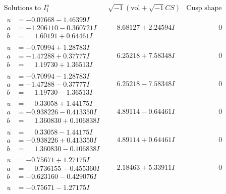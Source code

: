 \documentclass[1p]{elsarticle_modified}
\theoremstyle{definition}
\newcommand{\I}{\sqrt{-1}}
\begin{document}
$$\begin{array}{c|c|c}
\text{Solutions to }I^u_{1}& \I (\text{vol} + \sqrt{-1}CS) & \text{Cusp shape}\\
 \hline 
\begin{aligned}
u &= -0.07668 - 1.46399 I \\
a &= -1.206110 - 0.360721 I \\
b &= \phantom{-}1.60191 + 0.64461 I\end{aligned}
 & \phantom{-}8.68127 + 2.24594 I & \phantom{-0.000000 } 0 \\ \hline\begin{aligned}
u &= -0.70994 + 1.28783 I \\
a &= -1.47288 + 0.37777 I \\
b &= \phantom{-}1.19730 + 1.36513 I\end{aligned}
 & \phantom{-}6.25218 + 7.58348 I & \phantom{-0.000000 } 0 \\ \hline\begin{aligned}
u &= -0.70994 - 1.28783 I \\
a &= -1.47288 - 0.37777 I \\
b &= \phantom{-}1.19730 - 1.36513 I\end{aligned}
 & \phantom{-}6.25218 - 7.58348 I & \phantom{-0.000000 } 0 \\ \hline\begin{aligned}
u &= \phantom{-}0.33058 + 1.44175 I \\
a &= -0.938226 - 0.413350 I \\
b &= \phantom{-}1.360830 + 0.106838 I\end{aligned}
 & \phantom{-}4.89114 - 0.64461 I & \phantom{-0.000000 } 0 \\ \hline\begin{aligned}
u &= \phantom{-}0.33058 - 1.44175 I \\
a &= -0.938226 + 0.413350 I \\
b &= \phantom{-}1.360830 - 0.106838 I\end{aligned}
 & \phantom{-}4.89114 + 0.64461 I & \phantom{-0.000000 } 0 \\ \hline\begin{aligned}
u &= -0.75671 + 1.27175 I \\
a &= \phantom{-}0.736155 - 0.455360 I \\
b &= -0.623160 - 0.429076 I\end{aligned}
 & \phantom{-}2.18463 + 5.33911 I & \phantom{-0.000000 } 0 \\ \hline\begin{aligned}
u &= -0.75671 - 1.27175 I \\

\end{aligned}
\end{array}$$
\end{document}
